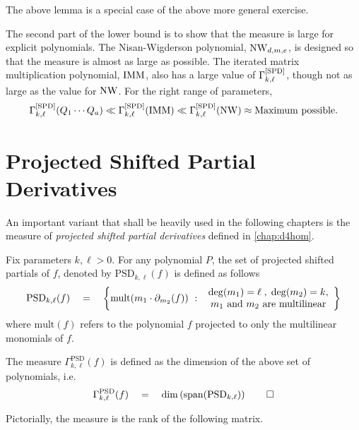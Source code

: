 The above lemma is a special case of the above more general exercise. 

The second part of the lower bound is to show that the measure is large for explicit polynomials. The Nisan-Wigderson polynomial, $\operatorname{\mathrm{NW}}_{d,m,e}$, is designed so that the measure is almost as large as possible. The iterated matrix multiplication polynomial, $\operatorname{\mathrm{IMM}}$, also has a large value of $\Gamma^{\mathrm{[SPD]}}_{k,\ell}$, though not as large as the value for $\operatorname{\mathrm{NW}}$. For the right range of parameters, 
\[
\Gamma^{\mathrm{[SPD]}}_{k,\ell}(Q_1\cdots Q_a) \ll \Gamma^{\mathrm{[SPD]}}_{k,\ell}(\operatorname{\mathrm{IMM}}) \ll \Gamma^{\mathrm{[SPD]}}_{k,\ell}(\operatorname{\mathrm{NW}}) \approx \text{Maximum possible}.
\]

\section{Projected Shifted Partial Derivatives}

An important variant that shall be heavily used in the following chapters is the measure of \emph{projected shifted partial derivatives} defined in \autoref{chap:d4hom}. 

\begin{definition*}
Fix parameters $k,\ell > 0$. 
For any polynomial $P$, the set of projected shifted partials of $f$, denoted by $\mathrm{PSD}_{k,\ell}(f)$ is defined as follows
\[
\mathrm{PSD}_{k,\ell}(f) \quad = \quad \left\{{\mathrm{mult}(m_1 \cdot \partial_{m_2}(f))}\ : \ {\begin{array}{c}\deg(m_1) = \ell\;,\; \deg(m_2) = k,\\ \text{$m_1$ and $m_2$ are multilinear}\end{array}}\right\}
\]
where $\mathrm{mult}(f)$ refers to the polynomial $f$ projected to only the multilinear monomials of $f$. 

The measure $\Gamma^{\mathrm{PSD}}_{k,\ell}(f)$ is defined as the dimension of the above set of polynomials, i.e.
\[\Gamma^{\mathrm{PSD}}_{k,\ell}(f) \quad = \quad \dim\left(\mathrm{span}(\mathrm{PSD}_{k,\ell})\right)\qedhere\]
\end{definition*}

Pictorially, the measure is the rank of the following matrix. 

